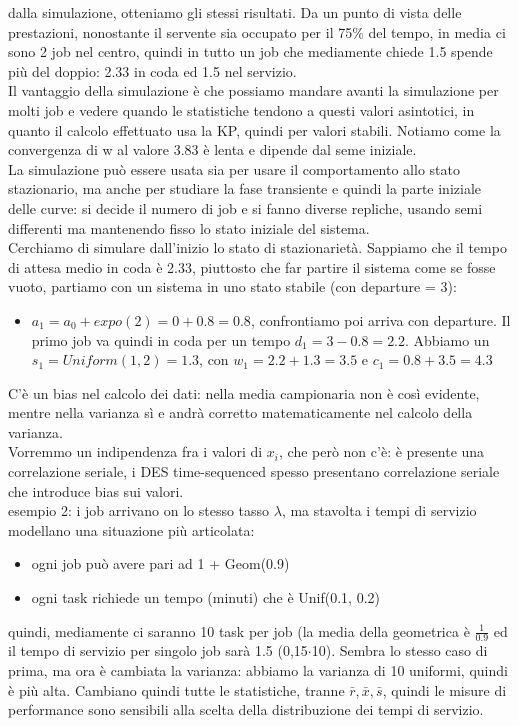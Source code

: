 \documentclass{article}
\begin{document}
dalla simulazione, otteniamo gli stessi risultati. Da un punto di vista delle prestazioni, nonostante il servente sia occupato per il 75\% del tempo, in media ci sono 2 job nel centro, quindi in tutto un job che mediamente chiede 1.5 spende più del doppio: 2.33 in coda ed 1.5 nel servizio.\\ Il vantaggio della simulazione è che possiamo mandare avanti la simulazione per molti job e vedere quando le statistiche tendono a questi valori asintotici, in quanto il calcolo effettuato usa la KP, quindi per valori stabili. Notiamo come la convergenza di w al valore 3.83 è lenta e dipende dal seme iniziale.\\ La simulazione può essere usata sia per usare il comportamento allo stato stazionario, ma anche per studiare la fase transiente e quindi la parte iniziale delle curve: si decide il numero di job e si fanno diverse repliche, usando semi differenti ma mantenendo fisso lo stato iniziale del sistema.\\Cerchiamo di simulare dall'inizio lo stato di stazionarietà. Sappiamo che il tempo di attesa medio in coda è 2.33, piuttosto che far partire il sistema come se fosse vuoto, partiamo con un sistema in uno stato stabile (con departure = 3):
\begin{itemize}
\item $a_1 = a_0 + expo(2) = 0 + 0.8 = 0.8$, confrontiamo poi arriva con departure. Il primo job va quindi in coda per un tempo $d_1 = 3-0.8 = 2.2$. Abbiamo un $s_1 = Uniform(1,2)=1.3$, con $w_1 = 2.2 + 1.3 = 3.5$ e $c_1 = 0.8+3.5 = 4.3$
\end{itemize}
C'è un bias nel calcolo dei dati: nella media campionaria non è così evidente, mentre nella varianza sì e andrà corretto matematicamente nel calcolo della varianza.\\ Vorremmo un indipendenza fra i valori di $x_i$, che però non c'è: è presente una correlazione seriale, i DES time-sequenced spesso presentano correlazione seriale che introduce bias sui valori.\\ esempio 2: i job arrivano on lo stesso tasso $\lambda$, ma stavolta i tempi di servizio modellano una situazione più articolata:
\begin{itemize}
\item ogni job può avere pari ad 1 + Geom(0.9)
\item ogni task richiede un tempo (minuti) che è Unif(0.1, 0.2) 
\end{itemize}
quindi, mediamente ci saranno 10 task per job (la media della geometrica è $\frac{1}{0.9}$ ed il tempo di servizio per singolo job sarà 1.5 (0,15$\cdot$10). Sembra lo stesso caso di prima, ma ora è cambiata la varianza: abbiamo la varianza di 10 uniformi, quindi è più alta. Cambiano quindi tutte le statistiche, tranne $\bar{r}, \bar{x}, \bar{s}$, quindi le misure di performance sono sensibili alla scelta della distribuzione dei tempi di servizio.
\end{document}
